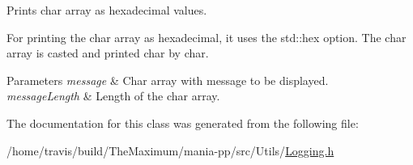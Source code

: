 Prints char array as hexadecimal values. 

For printing the char array as hexadecimal, it uses the std\-::hex option. The char array is casted and printed char by char.


\begin{DoxyParams}{Parameters}
{\em message} & Char array with message to be displayed. \\
\hline
{\em message\-Length} & Length of the char array. \\
\hline
\end{DoxyParams}


The documentation for this class was generated from the following file\-:\begin{DoxyCompactItemize}
\item 
/home/travis/build/\-The\-Maximum/mania-\/pp/src/\-Utils/\hyperlink{Logging_8h}{Logging.\-h}\end{DoxyCompactItemize}
